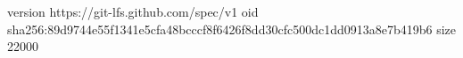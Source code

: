 version https://git-lfs.github.com/spec/v1
oid sha256:89d9744e55f1341e5cfa48bcccf8f6426f8dd30cfc500dc1dd0913a8e7b419b6
size 22000
